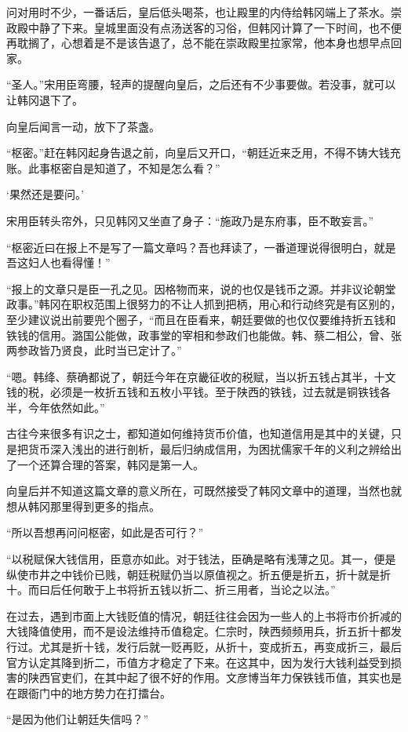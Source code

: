 问对用时不少，一番话后，皇后低头喝茶，也让殿里的内侍给韩冈端上了茶水。崇政殿中静了下来。皇城里面没有点汤送客的习俗，但韩冈计算了一下时间，也不便再耽搁了，心想着是不是该告退了，总不能在崇政殿里拉家常，他本身也想早点回家。

“圣人。”宋用臣弯腰，轻声的提醒向皇后，之后还有不少事要做。若没事，就可以让韩冈退下了。

向皇后闻言一动，放下了茶盏。

“枢密。”赶在韩冈起身告退之前，向皇后又开口，“朝廷近来乏用，不得不铸大钱充账。此事枢密自是知道了，不知是怎么看？”

‘果然还是要问。’

宋用臣转头帘外，只见韩冈又坐直了身子：“施政乃是东府事，臣不敢妄言。”

“枢密近曰在报上不是写了一篇文章吗？吾也拜读了，一番道理说得很明白，就是吾这妇人也看得懂！”

“报上的文章只是臣一孔之见。因格物而来，说的也仅是钱币之源。并非议论朝堂政事。”韩冈在职权范围上很努力的不让人抓到把柄，用心和行动终究是有区别的，至少建议说出前要兜个圈子，“而且在臣看来，朝廷要做的也仅仅要维持折五钱和铁钱的信用。潞国公能做，政事堂的宰相和参政们也能做。韩、蔡二相公，曾、张两参政皆乃贤良，此时当已定计了。”

“嗯。韩绛、蔡确都说了，朝廷今年在京畿征收的税赋，当以折五钱占其半，十文钱的税，必须是一枚折五钱和五枚小平钱。至于陕西的铁钱，过去就是铜铁钱各半，今年依然如此。”

古往今来很多有识之士，都知道如何维持货币价值，也知道信用是其中的关键，只是把货币深入浅出的进行剖析，最后归纳成信用，为困扰儒家千年的义利之辨给出了一个还算合理的答案，韩冈是第一人。

向皇后并不知道这篇文章的意义所在，可既然接受了韩冈文章中的道理，当然也就想从韩冈那里得到更多的指点。

“所以吾想再问问枢密，如此是否可行？”

“以税赋保大钱信用，臣意亦如此。对于钱法，臣确是略有浅薄之见。其一，便是纵使市井之中钱价已贱，朝廷税赋仍当以原值视之。折五便是折五，折十就是折十。而曰后任何敢于上书将折五钱以折二、折三用者，当论之以法。”

在过去，遇到市面上大钱贬值的情况，朝廷往往会因为一些人的上书将市价折减的大钱降值使用，而不是设法维持币值稳定。仁宗时，陕西频频用兵，折五折十都发行过。尤其是折十钱，发行后就一贬再贬，从折十，变成折五，再变成折三，最后官方认定其降到折二，币值方才稳定了下来。在这其中，因为发行大钱利益受到损害的陕西官吏们，在其中起了很不好的作用。文彦博当年力保铁钱币值，其实也是在跟衙门中的地方势力在打擂台。

“是因为他们让朝廷失信吗？”

